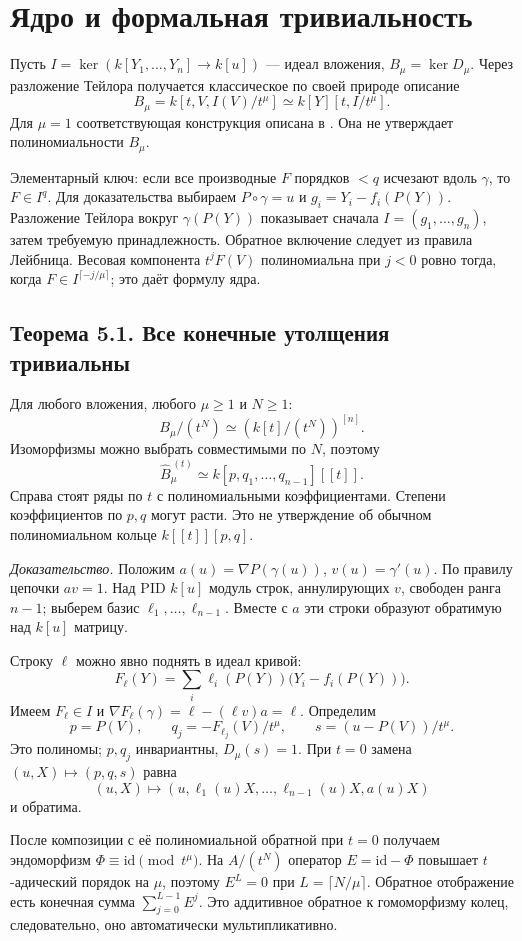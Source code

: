 \section{Ядро и формальная тривиальность}\label{sec:formal}
Пусть $I=\ker(k[Y_1,\ldots,Y_n]\to k[u])$ --- идеал вложения, $B_\mu=\ker D_\mu$. Через разложение Тейлора получается классическое по своей природе описание
\[
\boxed{B_\mu=k[t,V,I(V)/t^\mu]\simeq k[Y][t,I/t^\mu].}
\]
Для $\mu=1$ соответствующая конструкция описана в \cite[Proposition 5.4, Corollary 5.5]{vdER}. Она не утверждает полиномиальности $B_\mu$.

Элементарный ключ: если все производные $F$ порядков $<q$ исчезают вдоль $\gamma$, то $F\in I^q$. Для доказательства выбираем $P\circ\gamma=u$ и $g_i=Y_i-f_i(P(Y))$. Разложение Тейлора вокруг $\gamma(P(Y))$ показывает сначала $I=(g_1,\ldots,g_n)$, затем требуемую принадлежность. Обратное включение следует из правила Лейбница. Весовая компонента $t^jF(V)$ полиномиальна при $j<0$ ровно тогда, когда $F\in I^{\lceil-j/\mu\rceil}$; это даёт формулу ядра.

\subsection*{Теорема 5.1. Все конечные утолщения тривиальны}
Для любого вложения, любого $\mu\ge1$ и $N\ge1$:
\[
\boxed{B_\mu/(t^N)\simeq(k[t]/(t^N))^{[n]}.}
\]
Изоморфизмы можно выбрать совместимыми по $N$, поэтому
\[
\boxed{\widehat B_\mu^{\,(t)}\simeq k[p,q_1,\ldots,q_{n-1}][[t]].}
\]
Справа стоят ряды по $t$ с полиномиальными коэффициентами. Степени коэффициентов по $p,q$ могут расти. Это не утверждение об обычном полиномиальном кольце $k[[t]][p,q]$.

\textit{Доказательство.} Положим $a(u)=\nabla P(\gamma(u))$, $v(u)=\gamma'(u)$. По правилу цепочки $a v=1$. Над PID $k[u]$ модуль строк, аннулирующих $v$, свободен ранга $n-1$; выберем базис $\ell_1,\ldots,\ell_{n-1}$. Вместе с $a$ эти строки образуют обратимую над $k[u]$ матрицу.

Строку $\ell$ можно явно поднять в идеал кривой:
\[
F_\ell(Y)=\sum_i\ell_i(P(Y))\bigl(Y_i-f_i(P(Y))\bigr).
\]
Имеем $F_\ell\in I$ и $\nabla F_\ell(\gamma)=\ell-(\ell v)a=\ell$. Определим
\[
p=P(V),\qquad q_j=-F_{\ell_j}(V)/t^\mu,\qquad s=(u-P(V))/t^\mu.
\]
Это полиномы; $p,q_j$ инвариантны, $D_\mu(s)=1$. При $t=0$ замена $(u,X)\mapsto(p,q,s)$ равна
\[
(u,X)\longmapsto(u,\ell_1(u)X,\ldots,\ell_{n-1}(u)X,a(u)X)
\]
и обратима.

После композиции с её полиномиальной обратной при $t=0$ получаем эндоморфизм $\Phi\equiv\mathrm{id}\pmod{t^\mu}$. На $A/(t^N)$ оператор $E=\mathrm{id}-\Phi$ повышает $t$-адический порядок на $\mu$, поэтому $E^L=0$ при $L=\lceil N/\mu\rceil$. Обратное отображение есть конечная сумма $\sum_{j=0}^{L-1}E^j$. Это аддитивное обратное к гомоморфизму колец, следовательно, оно автоматически мультипликативно.

